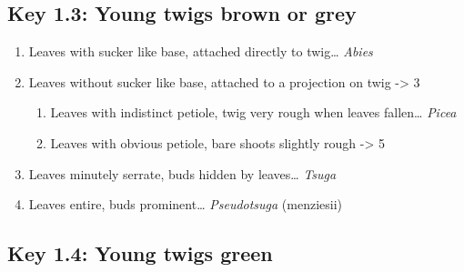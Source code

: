 \documentclass[openany]{book}
\providecommand{\tightlist}{%
  \setlength{\itemsep}{0pt}\setlength{\parskip}{0pt}}
\begin{document}
\hypertarget{key-1.3-young-twigs-brown-or-grey}{%
\subsection*{Key 1.3: Young twigs brown or
grey}\label{key-1.3-young-twigs-brown-or-grey}}

\begin{enumerate}
\def\labelenumi{\arabic{enumi}.}
\tightlist
\item
  Leaves with sucker like base, attached directly to twig\ldots{}
  \emph{Abies}
\item
  Leaves without sucker like base, attached to a projection on twig
  -\textgreater{} 3

  \begin{enumerate}
  \def\labelenumii{\arabic{enumii}.}
  \setcounter{enumii}{2}
  \tightlist
  \item
    Leaves with indistinct petiole, twig very rough when leaves
    fallen\ldots{} \emph{Picea}
  \item
    Leaves with obvious petiole, bare shoots slightly rough
    -\textgreater{} 5
  \end{enumerate}
\item
  Leaves minutely serrate, buds hidden by leaves\ldots{} \emph{Tsuga}
\item
  Leaves entire, buds prominent\ldots{} \emph{Pseudotsuga} (menziesii)
\end{enumerate}

\hypertarget{key-1.4-young-twigs-green}{%
\subsection*{Key 1.4: Young twigs
green}\label{key-1.4-young-twigs-green}}
\end{document}
